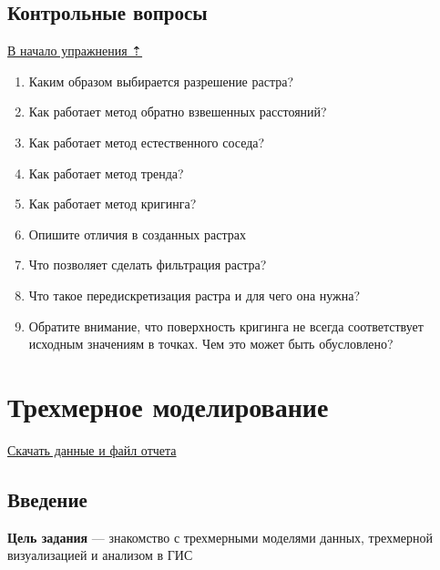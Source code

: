 \documentclass[12pt,]{book}
\begin{document}
\hypertarget{interpolation-questions}{%
\section{Контрольные вопросы}\label{interpolation-questions}}

\protect\hyperlink{interpolation}{В начало упражнения ⇡}

\begin{enumerate}
\def\labelenumi{\arabic{enumi}.}
\item
  Каким образом выбирается разрешение растра?
\item
  Как работает метод обратно взвешенных расстояний?
\item
  Как работает метод естественного соседа?
\item
  Как работает метод тренда?
\item
  Как работает метод кригинга?
\item
  Опишите отличия в созданных растрах
\item
  Что позволяет сделать фильтрация растра?
\item
  Что такое передискретизация растра и для чего она нужна?
\item
  Обратите внимание, что поверхность кригинга не всегда соответствует исходным значениям в точках. Чем это может быть обусловлено?
\end{enumerate}

\hypertarget{threed-modelling}{%
\chapter{Трехмерное моделирование}\label{threed-modelling}}

\href{http://autolab.geogr.msu.ru/gis/data/Ex18.zip}{Скачать данные и файл отчета}

\hypertarget{threed-modelling-intro}{%
\section{Введение}\label{threed-modelling-intro}}

\textbf{Цель задания} --- знакомство с трехмерными моделями данных, трехмерной визуализацией и анализом в ГИС
\end{document}
